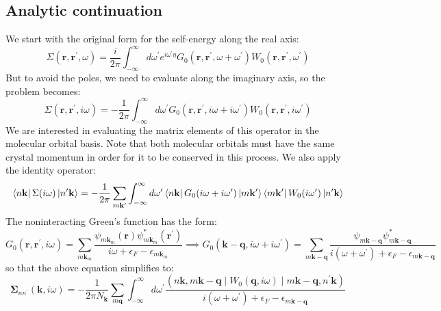 \subsection{Analytic continuation}
\label{sec:analytic_continuation}
We start with the original form for the self-energy along the real axis:
\begin{equation}
\Sigma\left(\mathbf{r}, \mathbf{r}^{\prime}, \omega\right)=\frac{i}{2 \pi} \int_{-\infty}^{\infty} d \omega^{\prime} e^{i \omega^{\prime} \eta} G_{0}\left(\mathbf{r}, \mathbf{r}^{\prime}, \omega+\omega^{\prime}\right) W_{0}\left(\mathbf{r}, \mathbf{r}^{\prime}, \omega^{\prime}\right)
\end{equation}
But to avoid the poles, we need to evaluate along the imaginary axis, so the problem becomes:
\begin{equation*}
\Sigma\left(\mathbf{r}, \mathbf{r}^{\prime}, i \omega\right)=-\frac{1}{2 \pi} \int_{-\infty}^{\infty} d \omega^{\prime} G_{0}\left(\mathbf{r}, \mathbf{r}^{\prime}, i \omega+i \omega^{\prime}\right) W_{0}\left(\mathbf{r}, \mathbf{r}^{\prime}, i \omega^{\prime}\right) 
\end{equation*}
We are interested in evaluating the matrix elements of this operator in the molecular orbital basis. Note that both molecular orbitals must have the same crystal momentum in order for it to be conserved in this process. We also apply the identity operator:
\begin{equation}
\bra{n\mathbf{k}} \Sigma (i \omega) \ket{n^\prime\mathbf{k}} = -\frac{1}{2 \pi} \sum_{m\mathbf{k}^\prime}\int_{-\infty}^{\infty} d \omega^{\prime} \bra{n\mathbf{k}} G_0(i \omega + i \omega^{\prime}) \ket{m\mathbf{k^\prime}}\bra{m\mathbf{k^\prime}}W_0(i \omega^{\prime}) \ket{n^\prime\mathbf{k}}
\end{equation}
The noninteracting Green's function has the form:
\begin{equation*}
G_{0}\left(\mathbf{r}, \mathbf{r}^{\prime}, i \omega\right)=\sum_{m \mathbf{k}_{m}} \frac{\psi_{m \mathbf{k}_{m}}(\mathbf{r}) \psi_{m \mathbf{k}_{m}}^{*}\left(\mathbf{r^\prime}\right)}{i \omega+\epsilon_{F}-\epsilon_{m \mathbf{k}_{m}}} \implies G_{0}\left(\mathbf{k} - \mathbf{q}, i \omega + i \omega^{\prime}\right) = \sum_{m \mathbf{k}-\mathbf{q}} \frac{\psi_{m \mathbf{k}-\mathbf{q}} \psi_{m \mathbf{k}-\mathbf{q}}^{*}}{i \left(\omega + \omega^{\prime}\right) + \epsilon_{F} - \epsilon_{m \mathbf{k}-\mathbf{q}}}
\end{equation*}
so that the above equation simplifies to:
\begin{equation}
\boldsymbol{\Sigma}_{n n^{\prime}}(\mathbf{k}, i \omega) = -\frac{1}{2 \pi N_{\mathbf{k}}} \sum_{m \mathbf{q}} \int_{-\infty}^{\infty} d \omega^{\prime} \frac{(n\mathbf{k}, m\mathbf{k}-\mathbf{q} \mid W_0 (\mathbf{q}, i\omega )\mid m \mathbf{k}-\mathbf{q}, n^{\prime}\mathbf{k})}{i \left(\omega + \omega^{\prime}\right) + \epsilon_{F} - \epsilon_{m \mathbf{k}-\mathbf{q}}}
\end{equation}
